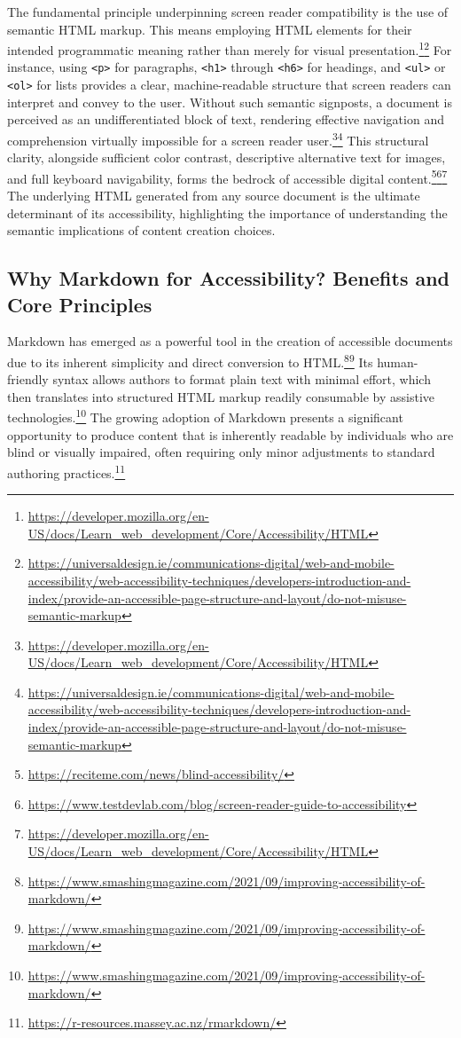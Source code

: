 The fundamental principle underpinning screen reader compatibility is the use of semantic HTML markup. This means employing HTML elements for their intended programmatic meaning rather than merely for visual presentation.\footnote{\url{https://developer.mozilla.org/en-US/docs/Learn_web_development/Core/Accessibility/HTML}}\footnote{\url{https://universaldesign.ie/communications-digital/web-and-mobile-accessibility/web-accessibility-techniques/developers-introduction-and-index/provide-an-accessible-page-structure-and-layout/do-not-misuse-semantic-markup}} For instance, using \texttt{<p>} for paragraphs, \texttt{<h1>} through \texttt{<h6>} for headings, and \texttt{<ul>} or \texttt{<ol>} for lists provides a clear, machine-readable structure that screen readers can interpret and convey to the user. Without such semantic signposts, a document is perceived as an undifferentiated block of text, rendering effective navigation and comprehension virtually impossible for a screen reader user.\footnote{\url{https://developer.mozilla.org/en-US/docs/Learn_web_development/Core/Accessibility/HTML}}\footnote{\url{https://universaldesign.ie/communications-digital/web-and-mobile-accessibility/web-accessibility-techniques/developers-introduction-and-index/provide-an-accessible-page-structure-and-layout/do-not-misuse-semantic-markup}} This structural clarity, alongside sufficient color contrast, descriptive alternative text for images, and full keyboard navigability, forms the bedrock of accessible digital content.\footnote{\url{https://reciteme.com/news/blind-accessibility/}}\footnote{\url{https://www.testdevlab.com/blog/screen-reader-guide-to-accessibility}}\footnote{\url{https://developer.mozilla.org/en-US/docs/Learn_web_development/Core/Accessibility/HTML}} The underlying HTML generated from any source document is the ultimate determinant of its accessibility, highlighting the importance of understanding the semantic implications of content creation choices.

\subsection{Why Markdown for Accessibility? Benefits and Core Principles}
Markdown has emerged as a powerful tool in the creation of accessible documents due to its inherent simplicity and direct conversion to HTML.\footnote{\url{https://www.smashingmagazine.com/2021/09/improving-accessibility-of-markdown/}}\footnote{\url{https://www.smashingmagazine.com/2021/09/improving-accessibility-of-markdown/}} Its human-friendly syntax allows authors to format plain text with minimal effort, which then translates into structured HTML markup readily consumable by assistive technologies.\footnote{\url{https://www.smashingmagazine.com/2021/09/improving-accessibility-of-markdown/}} The growing adoption of Markdown presents a significant opportunity to produce content that is inherently readable by individuals who are blind or visually impaired, often requiring only minor adjustments to standard authoring practices.\footnote{\url{https://r-resources.massey.ac.nz/rmarkdown/}}

